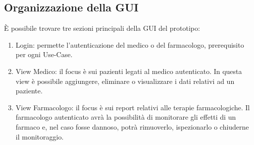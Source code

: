\documentclass[a4paper, 11pt]{article}
\begin{document}
		\subsection{Organizzazione della GUI}
		È possibile trovare tre sezioni principali della GUI del prototipo:
		\begin{enumerate}[label*=(\alph*)., nosep]
			\item Login: permette l'autenticazione del medico o del farmacologo, prerequisito per ogni Use-Case.
			\item View Medico: il focus è sui pazienti legati al medico autenticato. In questa view è possibile aggiungere, eliminare o visualizzare i dati relativi ad un paziente.
			\item View Farmacologo: il focus è sui report relativi alle terapie farmacologiche. Il farmacologo autenticato avrà la possibilità di monitorare gli effetti di un farmaco e, nel caso fosse dannoso, potrà rimuoverlo, ispezionarlo o chiuderne il monitoraggio. 
		\end{enumerate}
	
\end{document}
